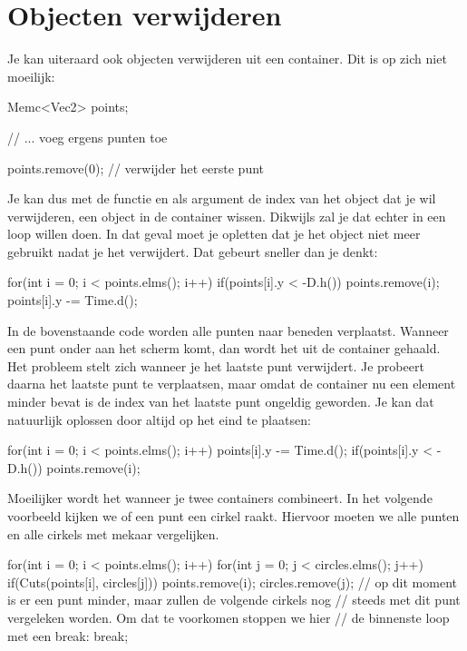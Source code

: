 \section{Objecten verwijderen}
Je kan uiteraard ook objecten verwijderen uit een container. Dit is op zich niet moeilijk:

\begin{code}
Memc<Vec2> points;

// ... voeg ergens punten toe

points.remove(0); // verwijder het eerste punt
\end{code}

Je kan dus met de functie  en als argument de index van het object dat je wil verwijderen, een object in de container wissen. Dikwijls zal je dat echter in een loop willen doen. In dat geval moet je opletten dat je het object niet meer gebruikt nadat je het verwijdert. Dat gebeurt sneller dan je denkt:

\begin{code}
for(int i = 0; i < points.elms(); i++) {
  if(points[i].y < -D.h()) points.remove(i);
	points[i].y -= Time.d();
}
\end{code}

In de bovenstaande code worden alle punten naar beneden verplaatst. Wanneer een punt onder aan het scherm komt, dan wordt het uit de container gehaald. Het probleem stelt zich wanneer je het laatste punt verwijdert. Je probeert daarna het laatste punt te verplaatsen, maar omdat de container nu een element minder bevat is de index van het laatste punt ongeldig geworden. Je kan dat natuurlijk oplossen door  altijd op het eind te plaatsen:

\begin{code}
for(int i = 0; i < points.elms(); i++) {
	points[i].y -= Time.d();
  if(points[i].y < -D.h()) points.remove(i);
}
\end{code}

Moeilijker wordt het wanneer je twee containers combineert. In het volgende voorbeeld kijken we of een punt een cirkel raakt. Hiervoor moeten we alle punten en alle cirkels met mekaar vergelijken.

\begin{code}
for(int i = 0; i < points.elms(); i++) {
	for(int j = 0; j < circles.elms(); j++) {
	  if(Cuts(points[i], circles[j])) {
		  points.remove(i);
		  circles.remove(j);
		  // op dit moment is er een punt minder, maar zullen de volgende cirkels nog 
		  // steeds met dit punt vergeleken worden. Om dat te voorkomen stoppen we hier 
			// de binnenste loop met een break:
			break;
		}		
	}
}
\end{code}

